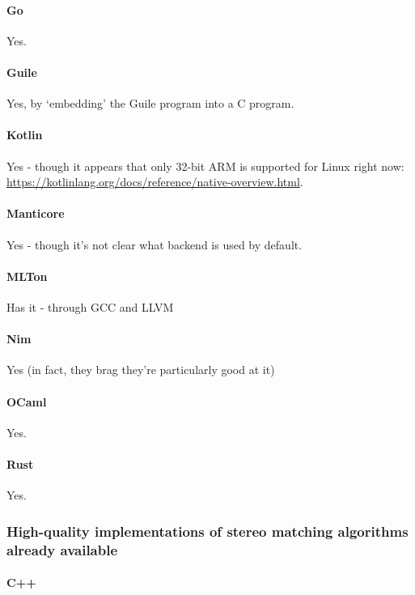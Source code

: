 \paragraph{Go}
Yes.

\paragraph{Guile}
Yes, by `embedding' the Guile program into a C program.

\paragraph{Kotlin}
Yes - though it appears that only 32-bit ARM is supported for Linux right now: \url{https://kotlinlang.org/docs/reference/native-overview.html}.

\paragraph{Manticore}
Yes - though it's not clear what backend is used by default.

\paragraph{MLTon}
Has it - through GCC and LLVM

\paragraph{Nim}
Yes (in fact, they brag they're particularly good at it)

\paragraph{OCaml}
Yes.


\paragraph{Rust}
Yes.

\subsubsection{High-quality implementations of stereo matching algorithms already available}

\paragraph{C++}

